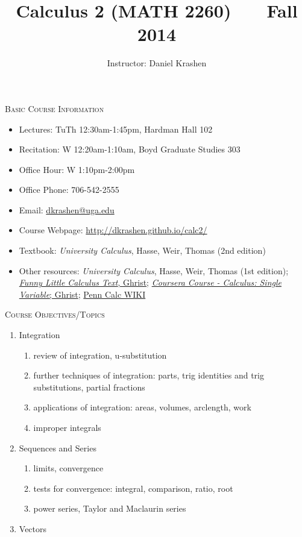 \documentclass[12pt]{amsart}
\title{Calculus 2 (MATH 2260) \ \ \ Fall 2014}
\author{Instructor: Daniel Krashen}
\begin{document}
\vspace{-2cm}
\maketitle


\thispagestyle{empty}
\noindent
\textsc{Basic Course Information}

\begin{itemize}
\item
Lectures: TuTh 12:30am-1:45pm, Hardman Hall 102
\item
Recitation: W 12:20am-1:10am, Boyd Graduate Studies 303
\item 
Office Hour: W 1:10pm-2:00pm
\item
Office Phone: 706-542-2555 
\item
Email: \url{dkrashen@uga.edu} 
\item
Course Webpage:  
\url{http://dkrashen.github.io/calc2/} 
\item
Textbook: \textit{University Calculus}, Hasse, Weir, Thomas (2nd edition)
\item
Other resources: 
\textit{University Calculus}, Hasse, Weir, Thomas (1st edition);
\href{http://www.math.upenn.edu/~ghrist/FLCT/}{\textit{Funny Little
Calculus Text}, Ghrist};
\href{https://class.coursera.org/calcsing-005/lecture/preview}{\textit{Coursera
Course -  Calculus: Single Variable}; Ghrist};
\href{http://calculus.seas.upenn.edu/}{Penn Calc WIKI}
\end{itemize}

\medskip

\noindent
\textsc{Course Objectives/Topics}
\begin{enumerate}
\item Integration
\begin{enumerate}
\item review of integration, u-substitution
\item further techniques of integration: parts, trig identities and trig
substitutions, partial fractions
\item applications of integration: areas, volumes, arclength, work
\item improper integrals
\end{enumerate}
\item Sequences and Series
\begin{enumerate}
\item limits, convergence
\item tests for convergence: integral, comparison, ratio, root
\item power series, Taylor and Maclaurin series
\end{enumerate}
\item Vectors
\end{enumerate}
\end{document}
